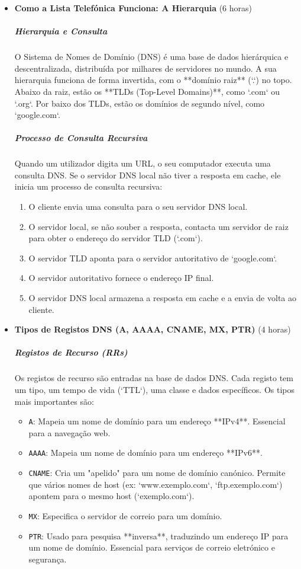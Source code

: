 \documentclass[10pt,a4paper]{article}
\begin{document}
	\begin{itemize}
		\item \textbf{Como a Lista Telefónica Funciona: A Hierarquia} (6 horas)
		\subparagraph{Hierarquia e Consulta} O Sistema de Nomes de Domínio (DNS) é uma base de dados hierárquica e descentralizada, distribuída por milhares de servidores no mundo. A sua hierarquia funciona de forma invertida, com o **domínio raiz** (`.`) no topo. Abaixo da raiz, estão os **TLDs (Top-Level Domains)**, como `.com` ou `.org`. Por baixo dos TLDs, estão os domínios de segundo nível, como `google.com`.
		\subparagraph{Processo de Consulta Recursiva} Quando um utilizador digita um URL, o seu computador executa uma consulta DNS. Se o servidor DNS local não tiver a resposta em cache, ele inicia um processo de consulta recursiva:
		\begin{enumerate}
			\item O cliente envia uma consulta para o seu servidor DNS local.
			\item O servidor local, se não souber a resposta, contacta um servidor de raiz para obter o endereço do servidor TLD (`.com`).
			\item O servidor TLD aponta para o servidor autoritativo de `google.com`.
			\item O servidor autoritativo fornece o endereço IP final.
			\item O servidor DNS local armazena a resposta em cache e a envia de volta ao cliente.
		\end{enumerate}
		
		\item \textbf{Tipos de Registos DNS (A, AAAA, CNAME, MX, PTR)} (4 horas)
		\subparagraph{Registos de Recurso (RRs)} Os registos de recurso são entradas na base de dados DNS. Cada registo tem um tipo, um tempo de vida (`TTL`), uma classe e dados específicos. Os tipos mais importantes são:
		\begin{itemize}
			\item \texttt{A}: Mapeia um nome de domínio para um endereço **IPv4**. Essencial para a navegação web.
			\item \texttt{AAAA}: Mapeia um nome de domínio para um endereço **IPv6**.
			\item \texttt{CNAME}: Cria um "apelido" para um nome de domínio canónico. Permite que vários nomes de host (ex: `www.exemplo.com`, `ftp.exemplo.com`) apontem para o mesmo host (`exemplo.com`).
			\item \texttt{MX}: Especifica o servidor de correio para um domínio.
			\item \texttt{PTR}: Usado para pesquisa **inversa**, traduzindo um endereço IP para um nome de domínio. Essencial para serviços de correio eletrónico e segurança.
		\end{itemize}
		

\end{itemize}
\end{document}
